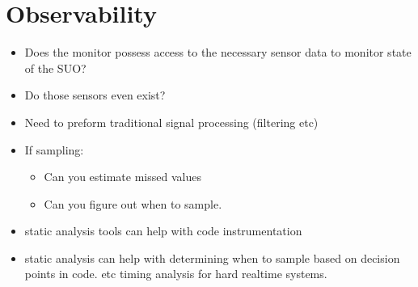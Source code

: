 \section{Observability}\label{sec:observ} 

\noindent{}


\begin{itemize} 
\item Does the monitor possess access to the necessary sensor data to
  monitor state of the SUO?
\item Do those sensors even exist?
\item Need to preform traditional signal processing (filtering etc)
\item  If sampling:
\begin{itemize}
\item Can you estimate missed values
\item Can you figure out when to sample.
\end{itemize}
\item static analysis tools can help with code instrumentation 
\item static analysis can help with determining when to sample based
  on decision points in code. etc timing analysis for hard realtime
  systems.
\end{itemize} 
